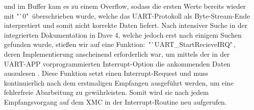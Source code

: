 \documentclass[12pt,a4paper,bibliography=totoc,listof=totoc]{scrartcl}
\begin{document}
und im Buffer kam es zu einem Overflow, sodass die ersten Werte bereits wieder mit "`0"\, überschrieben wurde, 
welche das UART-Protokoll als Byte-Stream-Ende interpretiert und somit nicht korrekte Daten liefert.
Nach intensiver Suche in der integrierten Dokumentation in Dave 4, welche jedoch erst nach einigem Suchen 
gefunden wurde, stießen wir auf eine Funktion:\, "`UART\_StartRecieveIRQ"\,, deren Implementierung anscheinend 
erforderlich war, um mittels der in der UART-APP vorprogrammierten Interrupt-Option die ankommenden Daten 
auszulesen \cite {infineon}
. Diese Funktion setzt einen Interrupt-Request und muss 
kontinuierlich nach dem erstmaligen Empfangen ausgeführt werden, um eine fehlerfreie Abarbeitung zu 
gewährleisten. Somit wird sie nach jedem Empfangsvorgang auf dem XMC in der Interrupt-Routine neu 
aufgerufen.


\end{document}
